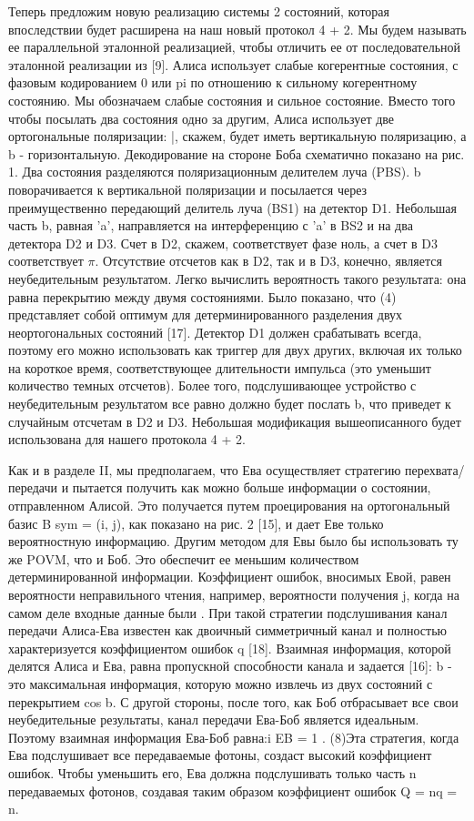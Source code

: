 Теперь предложим новую реализацию системы 2 состояний, которая впоследствии будет расширена на наш новый протокол 4 + 2. Мы будем называть ее параллельной эталонной реализацией, чтобы отличить ее от последовательной эталонной реализации из [9]. Алиса использует слабые когерентные состояния, с фазовым кодированием 0 или pi по отношению к сильному когерентному состоянию. Мы обозначаем слабые состояния и сильное состояние. Вместо того чтобы посылать два состояния одно за другим, Алиса использует две ортогональные поляризации: |, скажем, будет иметь вертикальную поляризацию, а b - горизонтальную. Декодирование на стороне Боба схематично показано на рис. 1. Два состояния разделяются поляризационным делителем луча (PBS). b поворачивается к вертикальной поляризации и посылается через преимущественно передающий делитель луча (BS1) на детектор D1. Небольшая часть b, равная 'a', направляется на интерференцию с 'a' в BS2 и на два детектора D2 и D3. Счет в D2, скажем, соответствует фазе ноль, а счет в D3 соответствует $\pi$. Отсутствие отсчетов как в D2, так и в D3, конечно, является неубедительным результатом. Легко вычислить вероятность такого результата: она равна перекрытию между двумя состояниями. Было показано, что (4) представляет собой оптимум для детерминированного разделения двух неортогональных состояний [17]. Детектор D1 должен срабатывать всегда, поэтому его можно использовать как триггер для двух других, включая их только на короткое время, соответствующее длительности импульса (это уменьшит количество темных отсчетов). Более того, подслушивающее устройство с неубедительным результатом все равно должно будет послать b, что приведет к случайным отсчетам в D2 и D3. Небольшая модификация вышеописанного будет использована для нашего протокола 4 + 2.

Как и в разделе II, мы предполагаем, что Ева осуществляет стратегию перехвата/передачи и пытается получить как можно больше информации о состоянии, отправленном Алисой. Это получается путем проецирования на ортогональный базис B sym = (i, j), как показано на рис. 2 [15], и дает Еве только вероятностную информацию. Другим методом для Евы было бы использовать ту же POVM, что и Боб. Это обеспечит ее меньшим количеством детерминированной информации. Коэффициент ошибок, вносимых Евой, равен вероятности неправильного чтения, например, вероятности получения j, когда на самом деле входные данные были . При такой стратегии подслушивания канал передачи Алиса-Ева известен как двоичный симметричный канал и полностью характеризуется коэффициентом ошибок q [18]. Взаимная информация, которой делятся Алиса и Ева, равна пропускной способности канала и задается [16]: b - это максимальная информация, которую можно извлечь из двух состояний с перекрытием cos b. С другой стороны, после того, как Боб отбрасывает все свои неубедительные результаты, канал передачи Ева-Боб является идеальным. Поэтому взаимная информация Ева-Боб равна:i EB = 1 .
(8)Эта стратегия, когда Ева подслушивает все передаваемые фотоны, создаст высокий коэффициент ошибок. Чтобы уменьшить его, Ева должна подслушивать только часть n передаваемых фотонов, создавая таким образом коэффициент ошибок Q = nq = n.

